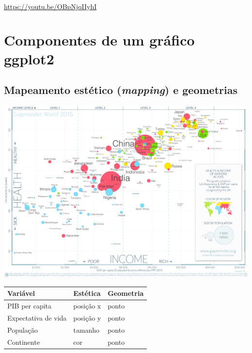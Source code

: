 \documentclass[
  12pt]{report}
\begin{document}
\begin{center} \url{https://youtu.be/OBpNjqIIyhI} \end{center}

\hypertarget{componentes-de-um-gruxe1fico-ggplot2}{%
\section{Componentes de um gráfico ggplot2}\label{componentes-de-um-gruxe1fico-ggplot2}}

\hypertarget{mapeamento-estuxe9tico-mapping-e-geometrias}{%
\subsection{\texorpdfstring{Mapeamento estético (\emph{mapping}) e geometrias}{Mapeamento estético (mapping) e geometrias}}\label{mapeamento-estuxe9tico-mapping-e-geometrias}}

\begin{center}\includegraphics[width=1\linewidth]{images/countries-1} \end{center}

\begin{longtable}[]{@{}lll@{}}
\toprule
Variável & Estética & Geometria \\
\midrule
\endhead
PIB per capita & posição x & ponto \\
Expectativa de vida & posição y & ponto \\
População & tamanho & ponto \\
Continente & cor & ponto \\
\bottomrule
\end{longtable}
\end{document}
